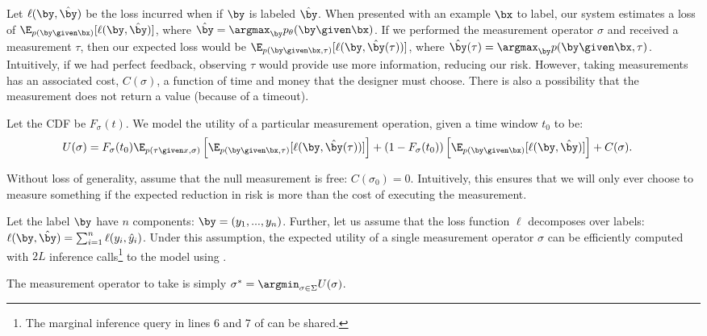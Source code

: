 Let $\ell(\by, \byt)$ be the loss incurred when if $\by$ is labeled $\byt$.
When presented with an example $\bx$ to label, our system estimates a loss of $\E_{p(\by \given \bx)}[\ell(\by, \byt)]$, where $\byt = \argmax_{\by} \p(\by \given \bx)$.
If we performed the measurement operator $\sigma$ and received a measurement $\tau$,
then our expected loss would be $\E_{p(\by \given \bx, \tau)}[\ell(\by, \byt(\tau))]$, where $\byt(\tau) = \argmax_{\by} p(\by \given \bx, \tau)$.
Intuitively, if we had perfect feedback, observing $\tau$ would provide use more information, reducing our risk.
However, taking measurements has an associated cost, $C(\sigma)$, a function of time and money that the designer must choose.
There is also a possibility that the measurement does not return a value (because of a timeout).

Let the CDF be $F_\sigma(t)$.
We model the utility of a particular measurement operation, given a time window $t_0$ to be:
\begin{align*}
U(\sigma)
&= F_\sigma(t_0) 
  \E_{p(\tau \given x, \sigma)} \left[\E_{p(\by \given \bx, \tau)}[\ell(\by, \byt(\tau))] \right]
  + (1 - F_\sigma(t_0)) 
    \left[\E_{p(\by \given \bx)}[\ell(\by, \byt)] \right]
  + C(\sigma).
\end{align*}

Without loss of generality, assume that the null measurement is free: $C(\sigma_0) = 0$.
Intuitively, this ensures that we will only ever choose to measure something if the expected reduction in risk is more than the cost of executing the measurement.

Let the label $\by$ have $n$ components: $\by = (y_1, ..., y_n)$.
Further, let us assume that the loss function $\ell$ decomposes over labels: $\ell(\by, \byt) = \sum_{i=1}^n \ell(y_i, \yt_i)$. 
Under this assumption, the expected utility of a single measurement operator $\sigma$ can be efficiently computed with $2L$ inference calls\footnote{The marginal inference query in lines 6 and 7 of  can be shared.} to the model using .

The measurement operator to take is simply $\sigma^* = \argmin_{\sigma \in \Sigma} U(\sigma)$.

